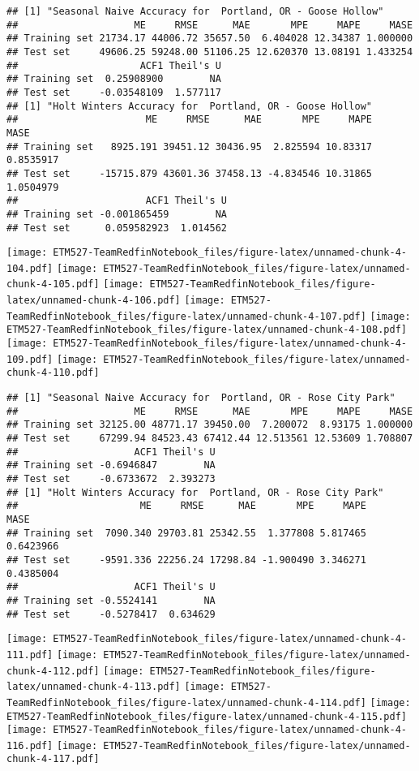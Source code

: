 \documentclass[]{article}
\begin{document}
\begin{verbatim}
## [1] "Seasonal Naive Accuracy for  Portland, OR - Goose Hollow"
##                    ME     RMSE      MAE       MPE     MAPE     MASE
## Training set 21734.17 44006.72 35657.50  6.404028 12.34387 1.000000
## Test set     49606.25 59248.00 51106.25 12.620370 13.08191 1.433254
##                     ACF1 Theil's U
## Training set  0.25908900        NA
## Test set     -0.03548109  1.577117
## [1] "Holt Winters Accuracy for  Portland, OR - Goose Hollow"
##                      ME     RMSE      MAE       MPE     MAPE      MASE
## Training set   8925.191 39451.12 30436.95  2.825594 10.83317 0.8535917
## Test set     -15715.879 43601.36 37458.13 -4.834546 10.31865 1.0504979
##                      ACF1 Theil's U
## Training set -0.001865459        NA
## Test set      0.059582923  1.014562
\end{verbatim}

\texttt{[image: ETM527-TeamRedfinNotebook\_files/figure-latex/unnamed-chunk-4-104.pdf]}
\texttt{[image: ETM527-TeamRedfinNotebook\_files/figure-latex/unnamed-chunk-4-105.pdf]}
\texttt{[image: ETM527-TeamRedfinNotebook\_files/figure-latex/unnamed-chunk-4-106.pdf]}
\texttt{[image: ETM527-TeamRedfinNotebook\_files/figure-latex/unnamed-chunk-4-107.pdf]}
\texttt{[image: ETM527-TeamRedfinNotebook\_files/figure-latex/unnamed-chunk-4-108.pdf]}
\texttt{[image: ETM527-TeamRedfinNotebook\_files/figure-latex/unnamed-chunk-4-109.pdf]}
\texttt{[image: ETM527-TeamRedfinNotebook\_files/figure-latex/unnamed-chunk-4-110.pdf]}

\begin{verbatim}
## [1] "Seasonal Naive Accuracy for  Portland, OR - Rose City Park"
##                    ME     RMSE      MAE       MPE     MAPE     MASE
## Training set 32125.00 48771.17 39450.00  7.200072  8.93175 1.000000
## Test set     67299.94 84523.43 67412.44 12.513561 12.53609 1.708807
##                    ACF1 Theil's U
## Training set -0.6946847        NA
## Test set     -0.6733672  2.393273
## [1] "Holt Winters Accuracy for  Portland, OR - Rose City Park"
##                     ME     RMSE      MAE       MPE     MAPE      MASE
## Training set  7090.340 29703.81 25342.55  1.377808 5.817465 0.6423966
## Test set     -9591.336 22256.24 17298.84 -1.900490 3.346271 0.4385004
##                    ACF1 Theil's U
## Training set -0.5524141        NA
## Test set     -0.5278417  0.634629
\end{verbatim}

\texttt{[image: ETM527-TeamRedfinNotebook\_files/figure-latex/unnamed-chunk-4-111.pdf]}
\texttt{[image: ETM527-TeamRedfinNotebook\_files/figure-latex/unnamed-chunk-4-112.pdf]}
\texttt{[image: ETM527-TeamRedfinNotebook\_files/figure-latex/unnamed-chunk-4-113.pdf]}
\texttt{[image: ETM527-TeamRedfinNotebook\_files/figure-latex/unnamed-chunk-4-114.pdf]}
\texttt{[image: ETM527-TeamRedfinNotebook\_files/figure-latex/unnamed-chunk-4-115.pdf]}
\texttt{[image: ETM527-TeamRedfinNotebook\_files/figure-latex/unnamed-chunk-4-116.pdf]}
\texttt{[image: ETM527-TeamRedfinNotebook\_files/figure-latex/unnamed-chunk-4-117.pdf]}
\end{document}
